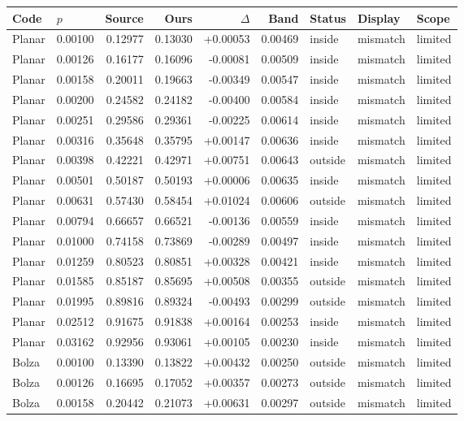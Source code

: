 \small\begin{longtable}{llrrrrlll}
\toprule Code & $p$ & Source & Ours & $\Delta$ & Band & Status & Display & Scope\\\midrule\endhead
Planar & 0.00100 & 0.12977 & 0.13030 & +0.00053 & 0.00469 & inside & mismatch & limited\\
Planar & 0.00126 & 0.16177 & 0.16096 & -0.00081 & 0.00509 & inside & mismatch & limited\\
Planar & 0.00158 & 0.20011 & 0.19663 & -0.00349 & 0.00547 & inside & mismatch & limited\\
Planar & 0.00200 & 0.24582 & 0.24182 & -0.00400 & 0.00584 & inside & mismatch & limited\\
Planar & 0.00251 & 0.29586 & 0.29361 & -0.00225 & 0.00614 & inside & mismatch & limited\\
Planar & 0.00316 & 0.35648 & 0.35795 & +0.00147 & 0.00636 & inside & mismatch & limited\\
Planar & 0.00398 & 0.42221 & 0.42971 & +0.00751 & 0.00643 & outside & mismatch & limited\\
Planar & 0.00501 & 0.50187 & 0.50193 & +0.00006 & 0.00635 & inside & mismatch & limited\\
Planar & 0.00631 & 0.57430 & 0.58454 & +0.01024 & 0.00606 & outside & mismatch & limited\\
Planar & 0.00794 & 0.66657 & 0.66521 & -0.00136 & 0.00559 & inside & mismatch & limited\\
Planar & 0.01000 & 0.74158 & 0.73869 & -0.00289 & 0.00497 & inside & mismatch & limited\\
Planar & 0.01259 & 0.80523 & 0.80851 & +0.00328 & 0.00421 & inside & mismatch & limited\\
Planar & 0.01585 & 0.85187 & 0.85695 & +0.00508 & 0.00355 & outside & mismatch & limited\\
Planar & 0.01995 & 0.89816 & 0.89324 & -0.00493 & 0.00299 & outside & mismatch & limited\\
Planar & 0.02512 & 0.91675 & 0.91838 & +0.00164 & 0.00253 & inside & mismatch & limited\\
Planar & 0.03162 & 0.92956 & 0.93061 & +0.00105 & 0.00230 & inside & mismatch & limited\\
Bolza & 0.00100 & 0.13390 & 0.13822 & +0.00432 & 0.00250 & outside & mismatch & limited\\
Bolza & 0.00126 & 0.16695 & 0.17052 & +0.00357 & 0.00273 & outside & mismatch & limited\\
Bolza & 0.00158 & 0.20442 & 0.21073 & +0.00631 & 0.00297 & outside & mismatch & limited\\

\end{longtable}
